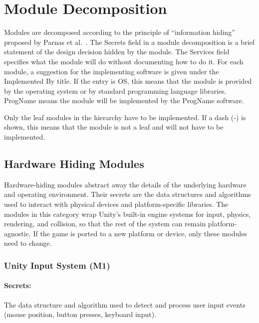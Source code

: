 \documentclass[12pt, titlepage]{article}
\begin{document}


\section{Module Decomposition}\label{SecMD}

Modules are decomposed according to the principle of ``information hiding'' proposed by
Parnas et al.~\cite{Parnas1984}. The Secrets field in a module decomposition is a brief statement
of the design decision hidden by the module. The Services field specifies what the
module will do without documenting how to do it. For each module, a suggestion for
the implementing software is given under the Implemented By title. If the entry is
OS, this means that the module is provided by the operating system or by standard
programming language libraries. ProgName means the module will be implemented by
the ProgName software.

\vspace{5mm}

Only the leaf modules in the hierarchy have to be implemented. If a dash (-) is shown, this means that the module is not a leaf and will not have to be implemented. 


\subsection{Hardware Hiding Modules}

Hardware-hiding modules abstract away the details of the underlying hardware and
operating environment. Their secrets are the data structures and algorithms used to
interact with physical devices and platform-specific libraries. The modules in this
category wrap Unity's built-in engine systems for input, physics, rendering, and
collision, so that the rest of the system can remain platform-agnostic. If the game
is ported to a new platform or device, only these modules need to change.

\subsubsection{Unity Input System (M1)}\label{M1}

\paragraph{Secrets:}
The data structure and algorithm used to detect and process user input events (mouse position, button presses, keyboard input).
\end{document}
